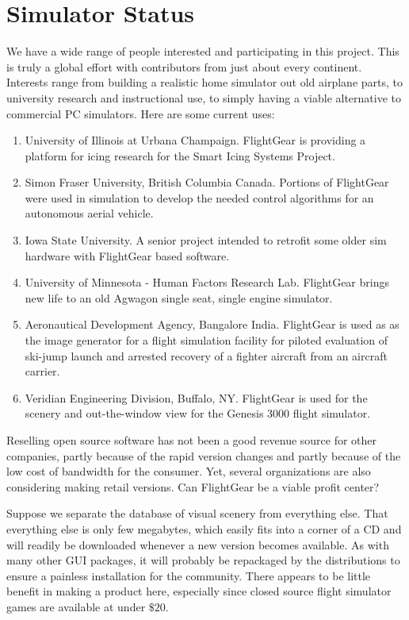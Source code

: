 \documentclass[a4paper,10pt]{article}
\begin{document}
\section*{Simulator Status}
%
We have a wide range of people interested and participating in this
project.  This is truly a global effort with contributors from just
about every continent.  Interests range from building a realistic home
simulator out old airplane parts, to university research and
instructional use, to simply having a viable alternative to commercial
PC simulators.  Here are some current uses:
%
\begin{enumerate}
%
\item University of Illinois at Urbana Champaign.
FlightGear is providing a platform for icing research for the Smart
Icing Systems Project.
%
\item Simon Fraser University, British Columbia Ca\-nada.
Portions of FlightGear were used in simulation to develop the needed
control algorithms for an autonomous aerial vehicle.
%
\item Iowa State University.
A senior project intended to retrofit some older sim hardware with
FlightGear based software.
%
\item University of Minnesota - Human Factors Research Lab.
FlightGear brings new life to an old Agwagon single seat, single
engine simulator.
%
%
\item Aeronautical Development Agency, Bangalore India.
FlightGear is used as as the image generator for a flight simulation
facility for piloted evaluation of ski-jump launch and arrested
recovery of a fighter aircraft from an aircraft carrier.
%
\item Veridian Engineering Division, Buffalo, NY.
FlightGear is used for the scenery and out-the-window view for the
Genesis 3000 flight simulator.
%
\end{enumerate}

Reselling open source software has not been a good revenue source
for other companies, partly because of the rapid version changes
and partly because of the low cost of bandwidth for the consumer.
Yet, several organizations are also considering making retail versions.
Can FlightGear be a viable profit center?

Suppose we separate the database of visual scenery from everything else.
That everything else is only few megabytes, which easily fits into a corner
of a CD and will readily be downloaded whenever a new version becomes available.  
As with many other GUI packages, it will probably be repackaged by the
distributions to ensure a painless installation for the community.
There appears to be little benefit in making a product here,
especially since closed source
flight simulator games are available at under $\$20$.
\end{document}
